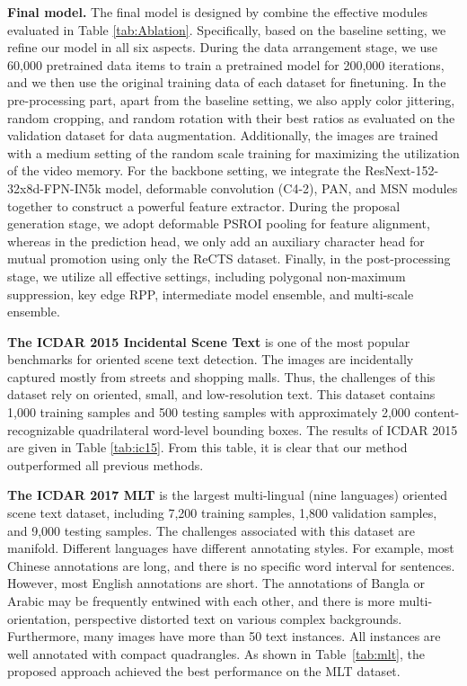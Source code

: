  {\bf Final model.} The final model is designed by combine
  the effective modules evaluated in Table \ref{tab:Ablation}. Specifically, based on the baseline setting, we refine our model in all six aspects. During the data arrangement stage, we use 60,000 pretrained data items to train a pretrained model for 200,000 iterations, and we then use the original training data of each dataset for finetuning. In the pre-processing part, apart from the baseline setting, we also apply color jittering, random cropping, and random rotation with their best ratios as evaluated on the validation dataset for data augmentation. Additionally, the images are trained with a medium setting of the random scale training for maximizing the utilization of the video memory. For the backbone setting, we integrate the ResNext-152-32x8d-FPN-IN5k model, deformable convolution (C4-2), PAN, and MSN modules together to construct a powerful feature extractor. During the proposal generation stage, we adopt deformable PSROI pooling for feature alignment, whereas in the prediction head, we only add an auxiliary character head for mutual promotion using only the ReCTS dataset. Finally, in the post-processing stage, we utilize all effective settings, including polygonal non-maximum suppression, key edge RPP, intermediate model ensemble, and multi-scale ensemble. 
  
  
  {\bf The ICDAR 2015 Incidental Scene Text} \cite{karatzas2015icdar} is one of the most popular benchmarks for oriented scene text detection. The images are incidentally captured mostly from streets and shopping malls. Thus, the challenges of this dataset rely on oriented, small, and low-resolution text. This dataset contains 1,000 training samples and 500 testing samples with approximately 2,000 content-recognizable quadrilateral word-level bounding boxes. The results of ICDAR 2015 are given in Table \ref{tab:ic15}. From this table, it is clear that our method outperformed all previous methods. 
  
  
  
  {\bf The ICDAR 2017 MLT} \cite{nayef2017icdar2017} is the largest multi-lingual (nine languages) oriented scene text dataset, including 7,200 training samples, 1,800 validation samples, and 9,000 testing samples. The challenges associated with this dataset are manifold. Different languages have different annotating styles. For example, most Chinese annotations are long, and there is no specific word interval for sentences. However, most English annotations are short. The annotations of Bangla or Arabic may be frequently entwined with each other, and there is more multi-orientation, perspective distorted text on various complex backgrounds. Furthermore, many images have more than 50 text instances. All instances are well annotated with compact quadrangles. As shown in Table~\ref{tab:mlt}, the proposed approach achieved the best performance on the MLT dataset.
  
